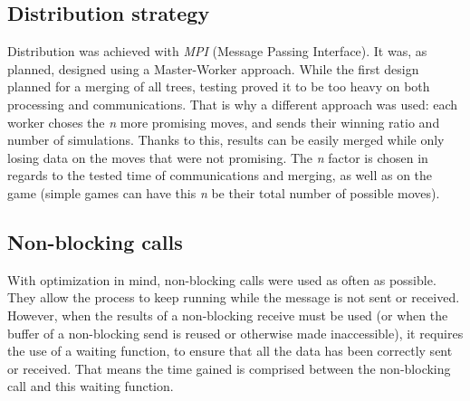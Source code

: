 \subsection{Distribution strategy}
Distribution was achieved with \textit{MPI}  (Message Passing Interface).
It was, as planned, designed using a Master-Worker approach.
While the first design planned for a merging of all trees, testing proved it to be too heavy on both processing and communications.
That is why a different approach was used: each worker choses the \textit{n} more promising moves, and sends their winning ratio and number of simulations.
Thanks to this, results can be easily merged while only losing data on the moves that were not promising.
The \textit{n} factor is chosen in regards to the tested time of communications and merging, as well as on the game (simple games can have this \textit{n} be their total number of possible moves).

\subsection{Non-blocking calls}
With optimization in mind, non-blocking calls were used as often as possible. They allow the process to keep running while the message is not sent or received.
However, when the results of a non-blocking receive must be used (or when the buffer of a non-blocking send is reused or otherwise made inaccessible), it requires the use of a waiting function, to ensure that all the data has been correctly sent or received.
That means the time gained is comprised between the non-blocking call and this waiting function.